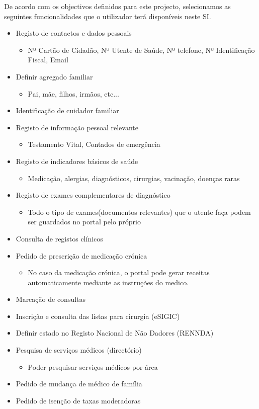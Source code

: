 \documentclass[12pt, a4paper, twoside]{report} %
\begin{document}
De acordo com os objectivos definidos para este projecto, selecionamos as seguintes funcionalidades que o utilizador terá disponíveis neste SI.

\begin{itemize}

\item Registo de contactos e dados pessoais
	\begin{itemize}
	\item Nº Cartão de Cidadão, Nº Utente de Saúde, Nº telefone, Nº Identificação Fiscal, Email
	\end{itemize}
\item Definir agregado familiar
	\begin{itemize}
	\item Pai, mãe, filhos, irmãos, etc...
	\end{itemize} 
\item Identificação de cuidador familiar 
\item Registo de informação pessoal relevante
	\begin{itemize}
	\item Testamento Vital, Contados de emergência
	\end{itemize}
\item Registo de indicadores básicos de saúde
	\begin{itemize}
	\item Medicação, alergias, diagnósticos, cirurgias, vacinação, doenças raras
	\end{itemize}
\item Registo de exames complementares de diagnóstico
	\begin{itemize}
	\item Todo o tipo de exames(documentos relevantes) que o utente faça podem ser guardados no portal pelo próprio
	\end{itemize}
\item Consulta de registos clínicos
\item Pedido de prescrição de medicação crónica
	\begin{itemize}
	\item No caso da medicação crónica, o portal pode gerar receitas automaticamente mediante as instruções do medico.
	\end{itemize}
\item Marcação de consultas
\item Inscrição e consulta das listas para cirurgia (eSIGIC)
\item Definir estado no Registo Nacional de Não Dadores (RENNDA)
\item Pesquisa de serviços médicos (directório)
	\begin{itemize}
	\item Poder pesquisar serviços médicos por área
	\end{itemize}
\item Pedido de mudança de médico de família
\item Pedido de isenção de taxas moderadoras

\end{itemize}
\end{document}
